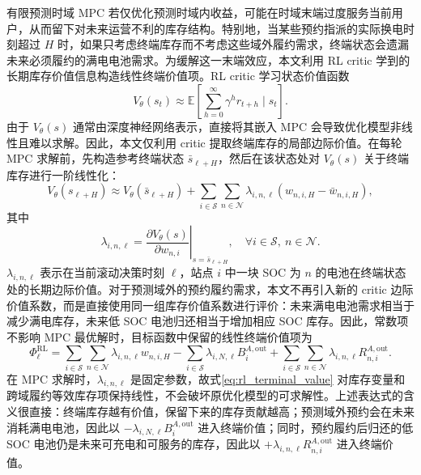 \documentclass[12pt,hyperref,a4paper,UTF8]{ctexart}
\begin{document}
有限预测时域 MPC 若仅优化预测时域内收益，可能在时域末端过度服务当前用户，从而留下对未来运营不利的库存结构。特别地，当某些预约指派的实际换电时刻超过 $H$ 时，如果只考虑终端库存而不考虑这些域外履约需求，终端状态会遗漏未来必须履约的满电电池需求。为缓解这一末端效应，本文利用 RL critic 学到的长期库存价值信息构造线性终端价值项。RL critic 学习状态价值函数
\begin{equation}
V_{\theta}(s_t)\approx
\mathbb{E}\left[\sum_{h=0}^{\infty}\gamma^h r_{t+h}\mid s_t\right].
\label{eq:critic_value}
\end{equation}
由于 $V_{\theta}(s)$ 通常由深度神经网络表示，直接将其嵌入 MPC 会导致优化模型非线性且难以求解。因此，本文仅利用 critic 提取终端库存的局部边际价值。在每轮 MPC 求解前，先构造参考终端状态 $\bar{s}_{\ell+H}$，然后在该状态处对 $V_{\theta}(s)$ 关于终端库存进行一阶线性化：
\begin{equation}
V_{\theta}(s_{\ell+H})
\approx
V_{\theta}(\bar{s}_{\ell+H})
+
\sum_{i\in\mathcal{S}}\sum_{n\in\mathcal{N}}
\lambda_{i,n,\ell}\left(w_{n,i,H}-\bar{w}_{n,i,H}\right),
\label{eq:value_linearization}
\end{equation}
其中
\begin{equation}
\lambda_{i,n,\ell}
=
\left.
\frac{\partial V_{\theta}(s)}{\partial w_{n,i}}
\right|_{s=\bar{s}_{\ell+H}},
\quad \forall i\in\mathcal{S},\ n\in\mathcal{N}.
\label{eq:marginal_value_w}
\end{equation}
$\lambda_{i,n,\ell}$ 表示在当前滚动决策时刻 $\ell$，站点 $i$ 中一块 SOC 为 $n$ 的电池在终端状态处的长期边际价值。对于预测域外的预约履约需求，本文不再引入新的 critic 边际价值系数，而是直接使用同一组库存价值系数进行评价：未来满电电池需求相当于减少满电库存，未来低 SOC 电池归还相当于增加相应 SOC 库存。因此，常数项不影响 MPC 最优解时，目标函数中保留的线性终端价值项为
\begin{equation}
\Phi^{\mathrm{RL}}_{\ell}
=
\sum_{i\in\mathcal{S}}\sum_{n\in\mathcal{N}}
\lambda_{i,n,\ell}w_{n,i,H}
-
\sum_{i\in\mathcal{S}}
\lambda_{i,N,\ell}B_{i}^{A,\mathrm{out}}
+
\sum_{i\in\mathcal{S}}\sum_{n\in\mathcal{N}}
\lambda_{i,n,\ell}R_{n,i}^{A,\mathrm{out}}.
\label{eq:rl_terminal_value}
\end{equation}
在 MPC 求解时，$\lambda_{i,n,\ell}$ 是固定参数，故式\eqref{eq:rl_terminal_value} 对库存变量和跨域履约等效库存项保持线性，不会破坏原优化模型的可求解性。上述表达式的含义很直接：终端库存越有价值，保留下来的库存贡献越高；预测域外预约会在未来消耗满电电池，因此以 $-\lambda_{i,N,\ell}B_{i}^{A,\mathrm{out}}$ 进入终端价值；同时，预约履约后归还的低 SOC 电池仍是未来可充电和可服务的库存，因此以 $+\lambda_{i,n,\ell}R_{n,i}^{A,\mathrm{out}}$ 进入终端价值。
\end{document}
